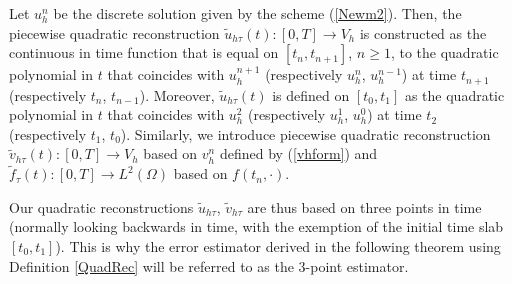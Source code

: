 \documentclass{imanum}
\begin{document}
\begin{definition}\label{QuadRec}
Let $u^n_h$ be the discrete solution given by the scheme (\ref{Newm2}).  Then, the piecewise quadratic reconstruction $\tilde{u}_{h\tau} (t) : [0, T] \rightarrow V_h$ is constructed as the continuous in time function that is equal on $[t_n, t_{n + 1}]$, $n\ge 1$, to the quadratic polynomial in $t$ that coincides with $u^{n + 1}_h$ (respectively $u^n_h$, $u^{n - 1}_h$) at time $t_{n+1}$ (respectively $t_n$, $t_{n - 1}$).  Moreover, $\tilde{u}_{h\tau} (t)$ is defined on $[t_0, t_{1}]$ as the quadratic polynomial in $t$ that coincides with $u^{2}_h$ (respectively $u^1_h$, $u^{0}_h$) at time $t_{2}$ (respectively $t_1$, $t_{0}$). Similarly, we introduce  piecewise quadratic reconstruction $\tilde{v}_{h\tau} (t) : [0, T] \rightarrow V_h$ based on $v^n_h$ defined by (\ref{vhform}) and $\tilde{f}_{\tau} (t) : [0, T] \rightarrow L^2(\Omega)$ based on $f(t_n,\cdot)$.  
\end{definition}

Our quadratic reconstructions $\tilde{u}_{h\tau}$, $\tilde{v}_{h\tau}$ are thus based on three points in time (normally looking backwards in time, with the exemption of the initial time slab $[t_0,t_1]$). This is why the error estimator derived in the following theorem using Definition \ref{QuadRec} will be referred to as the $3$-point estimator.  
\end{document}
